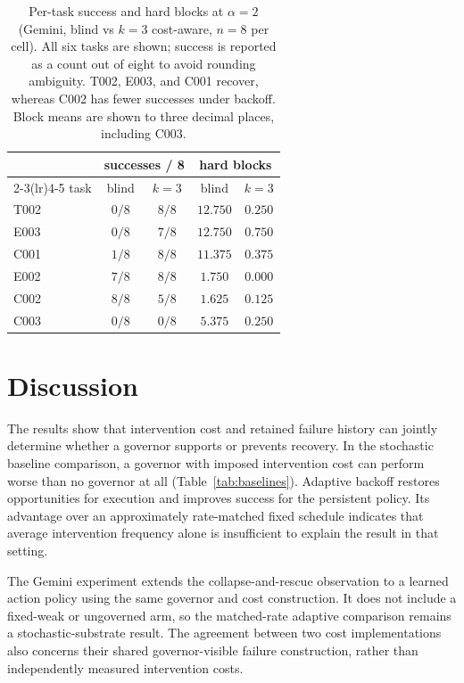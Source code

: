 \documentclass[11pt]{article}
\begin{document}
\begin{table}[t]
\centering
\caption{Per-task success and hard blocks at $\alpha=2$ (Gemini, blind vs
$k{=}3$ cost-aware, $n=8$ per cell). All six tasks are shown; success is
reported as a count out of eight to avoid rounding ambiguity. T002, E003,
and C001 recover, whereas C002 has fewer successes under backoff.
Block means are shown to three decimal places, including C003.}
\label{tab:gemini-tasks}
\begin{tabular}{lcccc}
\toprule
 & \multicolumn{2}{c}{successes / 8} & \multicolumn{2}{c}{hard blocks} \\
\cmidrule(lr){2-3}\cmidrule(lr){4-5}
task & blind & $k{=}3$ & blind & $k{=}3$ \\
\midrule
T002 & $0/8$ & $8/8$ & $12.750$ & $0.250$ \\
E003 & $0/8$ & $7/8$ & $12.750$ & $0.750$ \\
C001 & $1/8$ & $8/8$ & $11.375$ & $0.375$ \\
E002 & $7/8$ & $8/8$ & $1.750$ & $0.000$ \\
C002 & $8/8$ & $5/8$ & $1.625$ & $0.125$ \\
C003 & $0/8$ & $0/8$ & $5.375$ & $0.250$ \\
\bottomrule
\end{tabular}
\end{table}

\section{Discussion}

The results show that intervention cost and retained failure history can
jointly determine whether a governor supports or prevents recovery. In the
stochastic baseline comparison, a governor with imposed intervention cost can
perform worse than no governor at all (Table~\ref{tab:baselines}). Adaptive
backoff restores opportunities for execution and improves success for the
persistent policy. Its advantage over an approximately rate-matched fixed
schedule indicates that average intervention frequency alone is insufficient
to explain the result in that setting.

The Gemini experiment extends the collapse-and-rescue observation to a learned
action policy using the same governor and cost construction. It does not
include a fixed-weak or ungoverned arm, so the matched-rate adaptive comparison
remains a stochastic-substrate result. The agreement between two cost
implementations also concerns their shared governor-visible failure
construction, rather than independently measured intervention costs.
\end{document}
